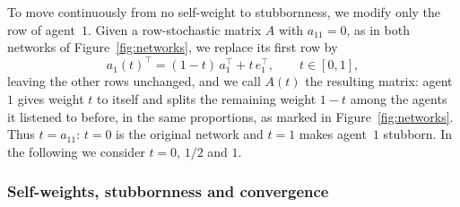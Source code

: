 To move continuously from no self-weight to stubbornness, we modify only the row of
agent~$1$. Given a row-stochastic matrix $A$ with $a_{11} = 0$, as in both networks of
Figure~\ref{fig:networks}, we replace its first row by
\begin{equation}\label{eq:self-weight}
  a_1(t)^\top = (1-t)\, a_1^\top + t\, e_1^\top, \qquad t \in [0,1],
\end{equation}
leaving the other rows unchanged, and we call $A(t)$ the resulting matrix: agent~$1$
gives weight $t$ to itself and splits the remaining weight $1-t$ among the agents it
listened to before, in the same proportions, as marked in Figure~\ref{fig:networks}.
Thus $t = a_{11}$:
 $t = 0$ is the original network and
$t = 1$ makes agent~$1$ stubborn. In the following we consider $t = 0$, $1/2$ and $1$.

\subsubsection{Self-weights, stubbornness and convergence}
\label{subsubsec:fdg-stub-conv}

